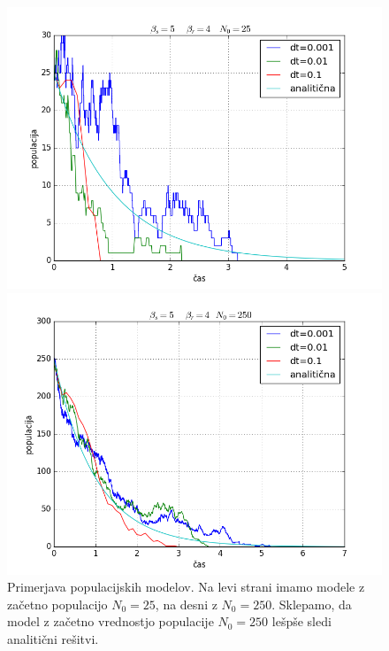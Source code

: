 \documentclass[slovene,11pt,a4paper]{article}
\numberwithin{equation}{section} %
\numberwithin{figure}{section} %
\numberwithin{table}{section} %
\begin{document}
\begin{figure}[h]
\centering
\begin{minipage}{0.5\textwidth}
\centering
\includegraphics[scale=0.45]{slike/populacija_umiranje_rojstvo_preprosto_25.png}
\end{minipage}\hfill
\begin{minipage}{0.5\textwidth}
\centering
\includegraphics[scale=0.45]{slike/populacija_umiranje_rojstvo_preprosto_250.png}
\end{minipage}
\caption{Primerjava populacijskih modelov. Na levi strani imamo modele z začetno populacijo $N_0=25$, na desni z $N_0=250$. Sklepamo, da model z začetno vrednostjo populacije $N_0=250$ lešpše sledi analitični rešitvi.}
\end{figure}
\end{document}
